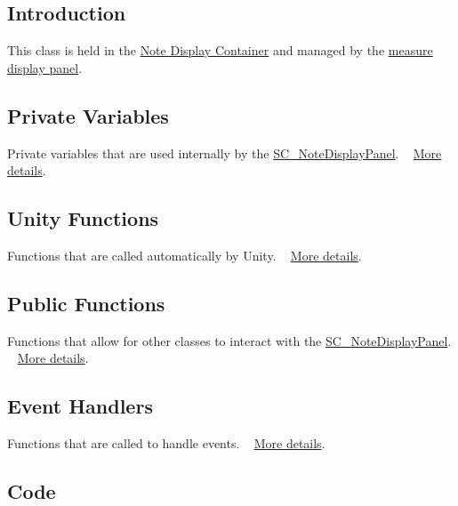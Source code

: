 \hypertarget{group___doc_s_c___n_d_p_intro}{}\subsection{Introduction}\label{group___doc_s_c___n_d_p_intro}
This class is held in the \hyperlink{group___doc_s_c___n_d_c}{Note Display Container} and managed by the \hyperlink{group___doc_s_c___m_d_p}{measure display panel}.\hypertarget{group___doc_s_c___n_d_p_DocSC_NDPPrivVar}{}\subsection{Private Variables}\label{group___doc_s_c___n_d_p_DocSC_NDPPrivVar}
Private variables that are used internally by the \hyperlink{class_s_c___note_display_panel}{S\+C\+\_\+\+Note\+Display\+Panel}. ~\newline
 \hyperlink{group___s_c___n_d_p_priv_var}{More details}.\hypertarget{group___doc_s_c___n_d_p_DocSC_NDPUnity}{}\subsection{Unity Functions}\label{group___doc_s_c___n_d_p_DocSC_NDPUnity}
Functions that are called automatically by Unity. ~\newline
 \hyperlink{group___s_c___n_d_p_unity}{More details}.\hypertarget{group___doc_s_c___n_d_p_DocSC_NDPPubFunc}{}\subsection{Public Functions}\label{group___doc_s_c___n_d_p_DocSC_NDPPubFunc}
Functions that allow for other classes to interact with the \hyperlink{class_s_c___note_display_panel}{S\+C\+\_\+\+Note\+Display\+Panel}. ~\newline
 \hyperlink{group___s_c___n_d_p_pub_func}{More details}.\hypertarget{group___doc_s_c___n_d_p_DocSC_NDPHandlers}{}\subsection{Event Handlers}\label{group___doc_s_c___n_d_p_DocSC_NDPHandlers}
Functions that are called to handle events. ~\newline
 \hyperlink{group___s_c___n_d_p_handlers}{More details}.\hypertarget{group___doc_s_c___n_d_p_DocSC_NDPCode}{}\subsection{Code}\label{group___doc_s_c___n_d_p_DocSC_NDPCode}

